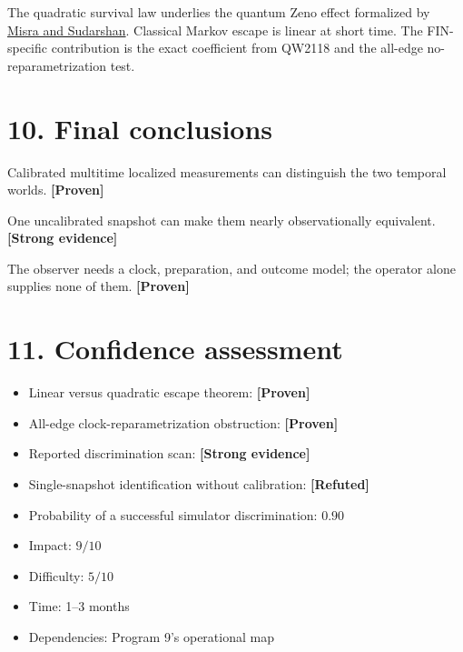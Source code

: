 \documentclass[11pt,a4paper,openany]{report}
\newcommand{\statusProven}{\textcolor{fingreen}{[Proven]}}
\newcommand{\statusStrong}{\textcolor{finblue}{[Strong evidence]}}
\newcommand{\statusRefuted}{\textcolor{finred}{[Refuted]}}
\begin{document}
The quadratic survival law underlies the quantum Zeno effect formalized by \href{https://doi.org/10.1063/1.523304}{Misra and Sudarshan}. Classical Markov escape is linear at short time. The FIN-specific contribution is the exact coefficient from QW2118 and the all-edge no-reparametrization test.

\section{10. Final conclusions}

Calibrated multitime localized measurements can distinguish the two temporal worlds. \textbf{\statusProven{}}

One uncalibrated snapshot can make them nearly observationally equivalent. \textbf{\statusStrong{}}

The observer needs a clock, preparation, and outcome model; the operator alone supplies none of them. \textbf{\statusProven{}}

\section{11. Confidence assessment}

\begin{itemize}
\item 
Linear versus quadratic escape theorem: \textbf{\statusProven{}}

\item 
All-edge clock-reparametrization obstruction: \textbf{\statusProven{}}

\item 
Reported discrimination scan: \textbf{\statusStrong{}}

\item 
Single-snapshot identification without calibration: \textbf{\statusRefuted{}}

\item 
Probability of a successful simulator discrimination: \(0.90\)

\item 
Impact: \(9/10\)

\item 
Difficulty: \(5/10\)

\item 
Time: 1–3 months

\item 
Dependencies: Program 9's operational map

\end{itemize}
\end{document}
